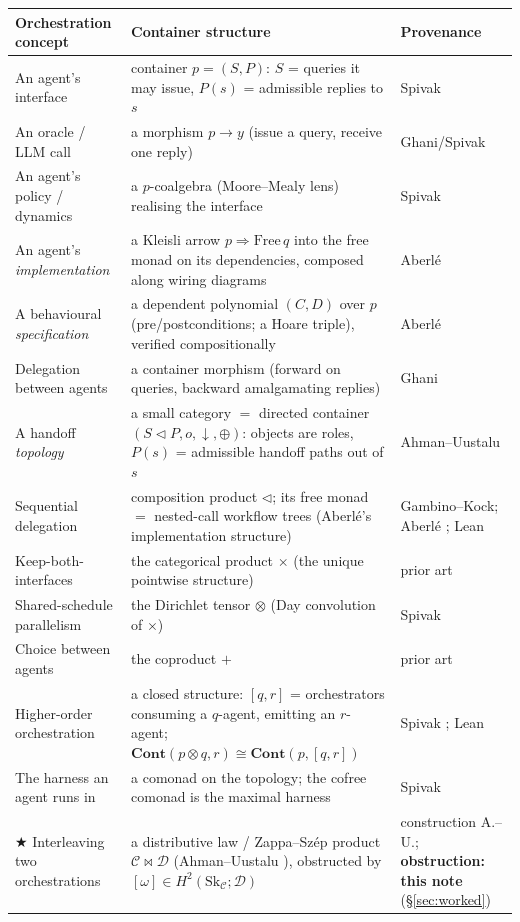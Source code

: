 \documentclass[11pt]{amsart}
\theoremstyle{definition}
\theoremstyle{remark}
\newcommand{\C}{\mathcal{C}}
\newcommand{\D}{\mathcal{D}}
\newcommand{\Sk}{\mathrm{Sk}}
\newcommand{\Cont}{\mathbf{Cont}}
\newcommand{\seq}{\triangleleft}
\newcommand{\dir}{\mathcal{D}}
\begin{document}
\begin{center}
\renewcommand{\arraystretch}{1.35}
\begin{tabular}{@{}p{4.5cm}p{6.5cm}p{2.4cm}@{}}
\toprule
Orchestration concept & Container structure & Provenance \\
\midrule
An agent's interface & container $p=(S,P)$: $S$ = queries it may issue, $P(s)$ = admissible
replies to $s$ & Spivak \cite{NiuSpivak} \\
An oracle / LLM call & a morphism $p\to y$ (issue a query, receive one reply) & Ghani/Spivak \\
An agent's policy / dynamics & a $p$-coalgebra (Moore--Mealy lens) realising the interface &
Spivak \cite{NiuSpivak} \\
An agent's \emph{implementation} & a Kleisli arrow $p\Rightarrow\mathrm{Free}\,q$ into the
free monad on its dependencies, composed along wiring diagrams & Aberl\'e \cite{aberle} \\
A behavioural \emph{specification} & a dependent polynomial $(C,D)$ over $p$
(pre/postconditions; a Hoare triple), verified compositionally & Aberl\'e \cite{aberle} \\
Delegation between agents & a container morphism (forward on queries, backward amalgamating
replies) & Ghani \\
A handoff \emph{topology} & a small category $=$ directed container $(S\seq P,o,\downarrow,\oplus)$:
objects are roles, $P(s)$ = admissible handoff paths out of $s$ & Ahman--Uustalu
\cite{AhmanUustalu} \\
Sequential delegation & composition product $\seq$; its free monad $=$ nested-call workflow
trees (Aberl\'e's implementation structure) & Gambino--Kock; Aberl\'e \cite{aberle}; Lean
\cite{leanfree} \\
Keep-both-interfaces & the categorical product $\times$ (the unique pointwise structure) &
prior art \\
Shared-schedule parallelism & the Dirichlet tensor $\otimes$ (Day convolution of $\times$) &
Spivak \cite{NiuSpivak} \\
Choice between agents & the coproduct $+$ & prior art \\
Higher-order orchestration & a closed structure: $[q,r]$ = orchestrators consuming a
$q$-agent, emitting an $r$-agent; $\Cont(p\otimes q,r)\cong\Cont(p,[q,r])$ & Spivak
\cite{NiuSpivak}; Lean \\
The harness an agent runs in & a comonad on the topology; the cofree comonad is the maximal
harness & Spivak \\
$\bigstar$ Interleaving two orchestrations & a distributive law / Zappa--Sz\'ep product
$\C\bowtie\D$ (Ahman--Uustalu \cite{AhmanUustaluDL}), obstructed by $[\omega]\in H^2(\Sk_\C;\dir)$ &
construction A.--U.; \textbf{obstruction: this note} (\S\ref{sec:worked}) \\
\bottomrule
\end{tabular}
\end{center}
\end{document}
